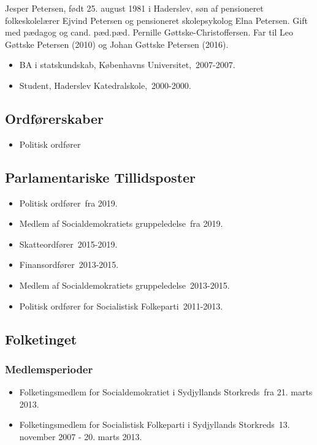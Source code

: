\documentclass[11pt, a4paper]{awesome-cv}
\begin{document}
\makecvheader[R]
\makelettertitle
\begin{cvletter}
Jesper Petersen, født 25. august 1981 i Haderslev, søn af pensioneret folkeskolelærer Ejvind Petersen og pensioneret skolepsykolog Elna Petersen. Gift med pædagog og cand. pæd.pæd. Pernille Gøttske-Christoffersen. Far til Leo Gøttske Petersen (2010) og Johan Gøttske Petersen (2016).

\begin{itemize}
\item BA i statskundskab, Københavns Universitet, 2007-2007.
\item Student, Haderslev Katedralskole, 2000-2000.
\end{itemize}
\subsection*{Ordførerskaber}
\begin{itemize}
\item Politisk ordfører
\end{itemize}
\subsection*{Parlamentariske Tillidsposter}
\begin{itemize}
\item Politisk ordfører fra 2019.
\item Medlem af Socialdemokratiets gruppeledelse fra 2019.
\item Skatteordfører 2015-2019.
\item Finansordfører 2013-2015.
\item Medlem af Socialdemokratiets gruppeledelse 2013-2015.
\item Politisk ordfører for Socialistisk Folkeparti 2011-2013.
\end{itemize}
\subsection*{Folketinget}
\subsubsection*{Medlemsperioder}
\begin{itemize}
\item Folketingsmedlem for Socialdemokratiet i Sydjyllands Storkreds fra 21. marts 2013.
\item Folketingsmedlem for Socialistisk Folkeparti i Sydjyllands Storkreds 13. november 2007 - 20. marts 2013.
\end{itemize}

\end{cvletter}
\end{document}

